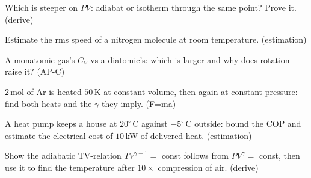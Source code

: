\begin{exercise}[medium]
Which is steeper on $PV$: adiabat or isotherm through the same point?
Prove it. (derive)
\end{exercise}
\begin{exercise}[medium]
Estimate the rms speed of a nitrogen molecule at room temperature.
(estimation)
\end{exercise}
\begin{exercise}[easy]
A monatomic gas's $C_V$ vs a diatomic's: which is larger and why does
rotation raise it? (AP-C)
\end{exercise}
\begin{exercise}[medium]
$2$\,mol of Ar is heated $50$\,K at constant volume, then again at
constant pressure: find both heats and the $\gamma$ they imply.
(F=ma)
\end{exercise}
\begin{exercise}[medium]
A heat pump keeps a house at $20^{\circ}$\,C against $-5^{\circ}$\,C
outside: bound the COP and estimate the electrical cost of $10$\,kW
of delivered heat. (estimation)
\end{exercise}
\begin{exercise}[hard]
Show the adiabatic TV-relation $TV^{\gamma-1}=$ const follows from
$PV^{\gamma}=$ const, then use it to find the temperature after
$10\times$ compression of air. (derive)
\end{exercise}
